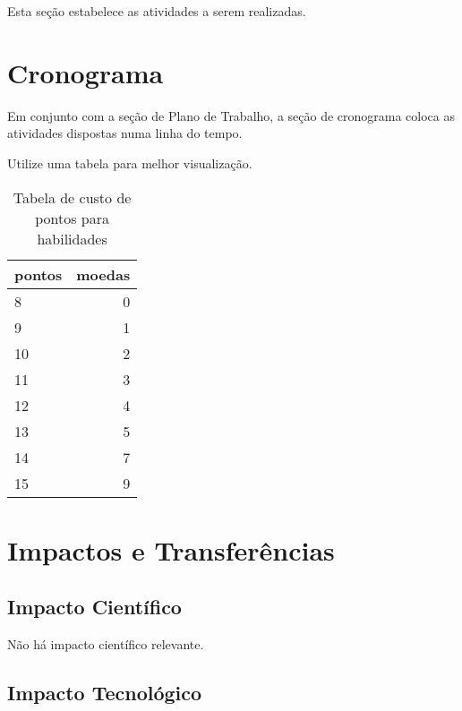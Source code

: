 \documentclass[a4paper,10pt]{article}  %
\begin{document}
Esta seção estabelece as atividades a serem realizadas.

\section{Cronograma}

Em conjunto com a seção de Plano de Trabalho, a seção de cronograma coloca as atividades dispostas numa linha do tempo.


Utilize uma tabela para melhor visualização.

\begin{table}
\begin{center}
 \caption{Tabela de custo de pontos para habilidades}
\begin{tabular}{|l|r|}
  \hline \hline
  pontos & moedas \\ \hline \hline
   8 & 0 \\ \hline
   9 & 1 \\ \hline
  10 & 2 \\ \hline
  11 & 3 \\ \hline
  12 & 4 \\ \hline
  13 & 5 \\ \hline
  14 & 7 \\ \hline
  15 & 9 \\ \hline \hline
\end{tabular} 
\label{tab:resultados}
\end{center}
\end{table}


\section{Impactos e Transferências}

\subsection{Impacto Científico}

Não há impacto científico relevante.

\subsection{Impacto Tecnológico}
\end{document}
